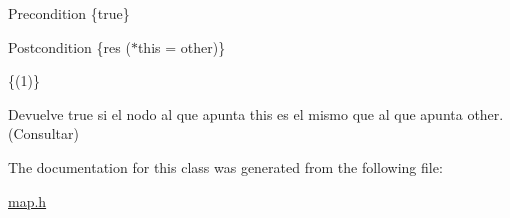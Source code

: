 \begin{DoxyPrecond}{\-Precondition}
\{true\} 
\end{DoxyPrecond}
\begin{DoxyPostcond}{\-Postcondition}
\{res  ($\ast$this = other)\}
\end{DoxyPostcond}
\{(1)\}

\-Devuelve true si el nodo al que apunta this es el mismo que al que apunta other. (\-Consultar) 

\-The documentation for this class was generated from the following file\-:\begin{DoxyCompactItemize}
\item 
\hyperlink{map_8h}{map.\-h}\end{DoxyCompactItemize}
